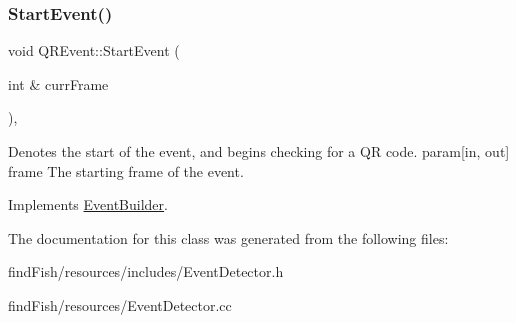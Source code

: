 \subsubsection{\texorpdfstring{StartEvent()}{StartEvent()}}
{\footnotesize\ttfamily void Q\+R\+Event\+::\+Start\+Event (\begin{DoxyParamCaption}\item[{int \&}]{curr\+Frame }\end{DoxyParamCaption})\hspace{0.3cm}{\ttfamily [override]}, {\ttfamily [virtual]}}

Denotes the start of the event, and begins checking for a QR code. param\mbox{[}in, out\mbox{]} frame The starting frame of the event. 

Implements \mbox{\hyperlink{class_event_builder_a62435c441382ebf14191b5b0c17904e3}{Event\+Builder}}.



The documentation for this class was generated from the following files\+:\begin{DoxyCompactItemize}
\item 
find\+Fish/resources/includes/Event\+Detector.\+h\item 
find\+Fish/resources/Event\+Detector.\+cc\end{DoxyCompactItemize}
